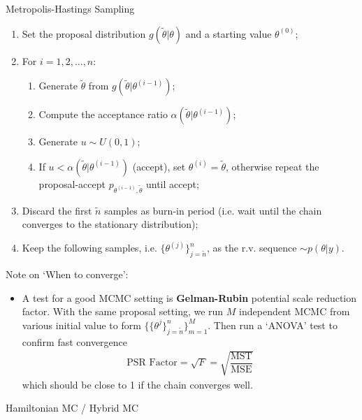 \begin{algorithm}{Metropolis-Hastings Sampling}
    \begin{enumerate}[topsep=2pt,itemsep=0pt]
        \item Set the proposal distribution $ g(\tilde{\theta }|\theta  ) $ and a starting value $ \theta ^{(0)} $;
        \item For $ i=1,2,\ldots,n $:
        \begin{enumerate}[topsep=2pt,itemsep=2pt]
            \item Generate $ \tilde{\theta } $ from $ g(\tilde{\theta }|\theta ^{(i-1)} ) $;
            \item Compute the acceptance ratio $ \alpha (\tilde{\theta }|\theta ^{(i-1)} ) $;
            \item Generate $ u\sim U(0,1) $;
            \item If $ u<\alpha (\tilde{\theta }|\theta ^{(i-1)} ) $ (accept), set $ \theta ^{(i)}=\tilde{\theta } $, otherwise repeat the proposal-accept $ p_{\theta ^{(i-1)},\tilde{\theta }} $ until accept;
        \end{enumerate}
        \item Discard the first $ \tilde{n} $ samples as burn-in period (i.e. wait until the chain converges to the stationary distribution);
        \item Keep the following samples, i.e. $ \{\theta ^{(j)}\}_{j=\tilde{n}}^n $, as the r.v. sequence $ \sim p(\theta |y) $.
    \end{enumerate}
\end{algorithm}

Note on `When to converge':
\begin{itemize}[topsep=2pt,itemsep=0pt]
    \item A test for a good MCMC setting is \textbf{Gelman-Rubin} potential scale reduction factor. With the same proposal setting, we run $ M $ independent MCMC from various initial value to form $ \{\{\theta^{j} \}_{j=\tilde{n}}^n\}_{m=1}^M $. Then run a `ANOVA' test to confirm fast convergence
    \begin{align}
        \text{PSR Factor}=\sqrt{F}=\sqrt{\dfrac{ \mathrm{MST}   }{ \mathrm{MSE}   } }
    \end{align}
    which should be close to 1 if the chain converges well.
\end{itemize}

    


\begin{point}
    Hamiltonian MC / Hybrid MC
\end{point}

